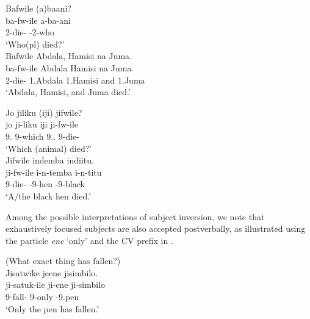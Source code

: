 \documentclass[output=paper]{langscibook}
\begin{document}
\ea
\label{bkm:Ref122117043}
\ea
Bafwile (a)baani?\\
\gll
ba-fw-ile  a-ba-ani\\
2\SM{}-die-\PFV{}  \AUG{}-2-who\\
\glt
‘Who(pl) died?’\\

\ex
Bafwile Abdala, Hamisi na Juma.\\
\gll
ba-fw-ile  Abdala  Hamisi  na  Juma\\
2\SM{}-die-\PFV{}  1.Abdala  1.Hamisi  and  1.Juma\\
\glt
‘Abdala, Hamisi, and Juma died.’ \citep[171]{MsovelaEtAl2023}\\

\z
\z

\ea
\label{bkm:Ref122117045}
\ea
Jo jiliku (iji)  jifwile?\\
\gll
jo  ji-liku   iji   ji-fw-ile\\
9.\IDCOP{}   9-which  9.\DEM{}.\PROX{}   9\SM{}-die-\PFV{}\\
\glt
‘Which (animal) died?’\\


\ex
Jifwile indemba indiitu.\\
\gll
ji-fw-ile   i-n-temba   i-n-titu\\
9\SM{}-die-\PFV{}   \AUG{}-9-hen   \AUG{}-9-black\\
\glt
‘A/the black hen died.’ \citep[171]{MsovelaEtAl2023}\\

\z
\z

Among the possible interpretations of subject inversion, we note that exhaustively focused subjects are also accepted postverbally, as illustrated using the particle \textit{ene} ‘only’ and the CV prefix in .

\ea
\label{bkm:Ref148767651}
(What exact thing has fallen?)\\
Jisatwike jeene jisimbilo.\\
\gll
ji-satuk-ile  ji-ene  ji-simbilo\\
9\SM{}-fall-\PFV{}  9-only  \EXH{}-9.pen\\
\glt
‘Only the pen has fallen.’\\
\end{document}
